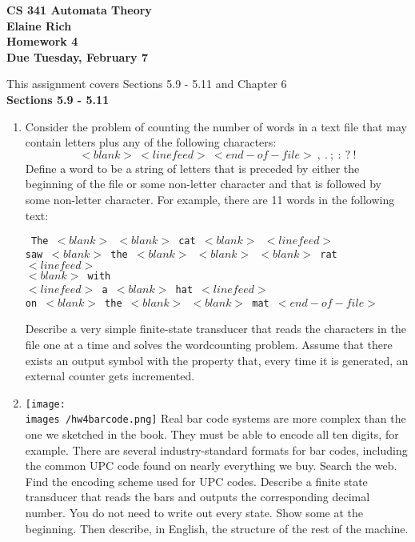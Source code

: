 \documentclass[10pt]{article}
\newcommand{\images}{/home/gparker/classes/341/images}
\begin{document}
\begin{center}
\textbf{
CS 341 Automata Theory \\
Elaine Rich \\
Homework 4 \\
Due Tuesday, February 7}\\
\end{center}
\noindent
This assignment covers Sections 5.9 - 5.11 and Chapter 6 \\

\noindent
\textbf{Sections 5.9 - 5.11}
\begin{enumerate}[1)]
\addtocounter{enumi}{14}

\item
Consider the problem of counting the number of words in a text file that may contain letters plus any  of the following characters:
\[<blank>\ <linefeed>\ <end-of-file>\ ,\ .\ ;\ :\ ?\ !\]
Define a word to be a string of letters that is preceded by either the beginning of the file or some non-letter character and that is followed by some non-letter character.  For example, there are 11 words in the following text:
\begin{flushleft}

\parindent 2cm

\texttt{\noindent
\hspace{2cm}The $<blank>$ $<blank>$ cat $<blank>$ $<linefeed>$\\
saw $<blank>$ the $<blank>$ $<blank>$ $<blank>$ rat $<linefeed>$\\
$<blank>$ with\\
$<linefeed>$ a $<blank>$ hat $<linefeed>$\\
on $<blank>$ the $<blank>$ $<blank>$ mat $<end-of-file>$
}
\end{flushleft}
Describe a very simple finite-state transducer that reads the characters in the file one at a time and solves the wordcounting problem.  Assume that there exists an output symbol with the property that, every time it is generated, an 
external counter gets incremented.

\addtocounter{enumi}{1}

\item
\texttt{[image: \\images /hw4barcode.png]}
Real bar code systems are more complex than the one we sketched in the book.  They 
must be able to encode all ten digits, for example.  There are several industry-standard 
formats for bar codes, including the common UPC code found on nearly everything we 
buy.  Search the web.  Find the encoding scheme used for UPC codes.  Describe a finite 
state transducer that reads the bars and outputs the corresponding decimal number.  You do 
not need to write out every state.  Show some at the beginning.  Then describe, in English, 
the structure of the rest of the machine.




\end{enumerate}
\end{document}

